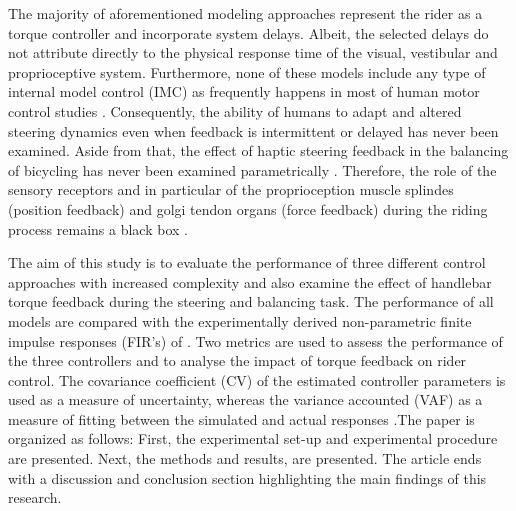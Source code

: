 The majority of aforementioned modeling approaches represent the rider as a torque controller and incorporate system delays. Albeit, the selected delays do not attribute directly to the physical response time of the visual, vestibular and proprioceptive system. Furthermore, none of these models include any type of internal model control (IMC) as frequently happens in most of human motor control studies \cite{francis1976internal, garcia1982internal, wolpert1995internal, gillespie2016human}. Consequently, the ability of humans to adapt and altered steering dynamics even when feedback is intermittent or delayed has never been examined.  Aside from that, the effect of haptic steering feedback in the balancing of bicycling has never been examined parametrically . Therefore, the role of the sensory receptors and in particular of the proprioception muscle splindes (position feedback) and golgi tendon organs (force feedback) during the riding process remains a black box .

The aim of this study is to evaluate the performance of three different control approaches with increased complexity and also examine the effect of  handlebar torque feedback during the steering and balancing task. The performance of all models are compared with the experimentally derived non-parametric finite impulse responses (FIR's) of  \citet{dialynaseffect}. Two metrics are used to assess the performance of the three controllers and to analyse the impact of torque feedback on rider control. The covariance coefficient (CV) of the estimated controller parameters is used as a measure of uncertainty, whereas the variance accounted (VAF) as a measure of fitting between the simulated and actual responses .The paper is organized as follows: First, the experimental set-up and experimental procedure are presented. Next, the methods and results, are presented. The article ends with a discussion and conclusion section highlighting the main findings of this research.


